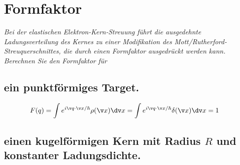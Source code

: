 \documentclass[ex, minted]{exercise_4.1}
\begin{document}
\section{Formfaktor}
{\it Bei der elastischen Elektron-Kern-Streuung führt die ausgedehnte Ladungsverteilung des Kernes zu einer Modifikation des Mott/Rutherford-Streuquerschnittes, die durch einen Formfaktor ausgedrückt werden kann. Berechnen Sie den Formfaktor für }

\subsection{ein punktförmiges Target.}

\dottedlinete

\begin{align*}
    F(q) 
    &= \int e^{i \v q\cdot \v x / \hbar } \rho(\v x) \dv x
    = \int e^{i \v q\cdot \v x / \hbar } \delta(\v x ) \dv x= 1
\end{align*}

\subsection{einen kugelförmigen Kern mit Radius \(R\) und konstanter Ladungsdichte.}

\dottedlinett
\end{document}
